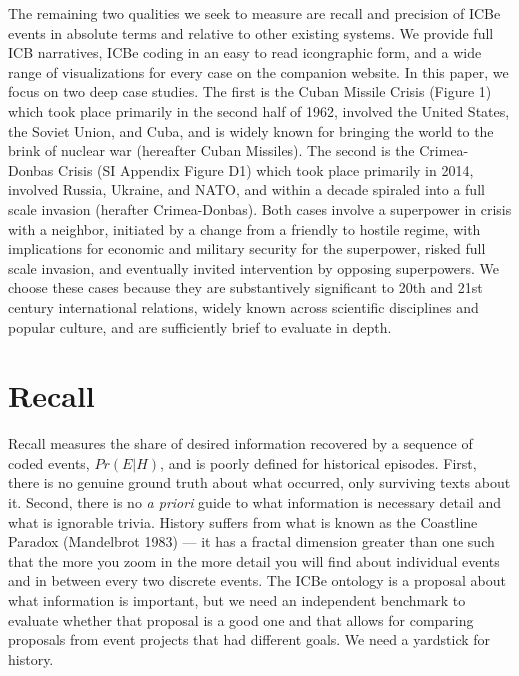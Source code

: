 \documentclass{article}
\begin{document}
The remaining two qualities we seek to measure are recall and precision
of ICBe events in absolute terms and relative to other existing systems.
We provide full ICB narratives, ICBe coding in an easy to read
icongraphic form, and a wide range of visualizations for every case on
the companion website. In this paper, we focus on two deep case studies.
The first is the Cuban Missile Crisis (Figure 1) which took place
primarily in the second half of 1962, involved the United States, the
Soviet Union, and Cuba, and is widely known for bringing the world to
the brink of nuclear war (hereafter Cuban Missiles). The second is the
Crimea-Donbas Crisis (SI Appendix Figure D1) which took place primarily
in 2014, involved Russia, Ukraine, and NATO, and within a decade
spiraled into a full scale invasion (herafter Crimea-Donbas). Both cases
involve a superpower in crisis with a neighbor, initiated by a change
from a friendly to hostile regime, with implications for economic and
military security for the superpower, risked full scale invasion, and
eventually invited intervention by opposing superpowers. We choose these
cases because they are substantively significant to 20th and 21st
century international relations, widely known across scientific
disciplines and popular culture, and are sufficiently brief to evaluate
in depth.

\hypertarget{recall}{%
\section{Recall}\label{recall}}

Recall measures the share of desired information recovered by a sequence
of coded events, \(Pr(E|H)\), and is poorly defined for historical
episodes. First, there is no genuine ground truth about what occurred,
only surviving texts about it. Second, there is no \textit{a priori}
guide to what information is necessary detail and what is ignorable
trivia. History suffers from what is known as the Coastline Paradox
(Mandelbrot 1983) --- it has a fractal dimension greater than one such
that the more you zoom in the more detail you will find about individual
events and in between every two discrete events. The ICBe ontology is a
proposal about what information is important, but we need an independent
benchmark to evaluate whether that proposal is a good one and that
allows for comparing proposals from event projects that had different
goals. We need a yardstick for history.
\end{document}

